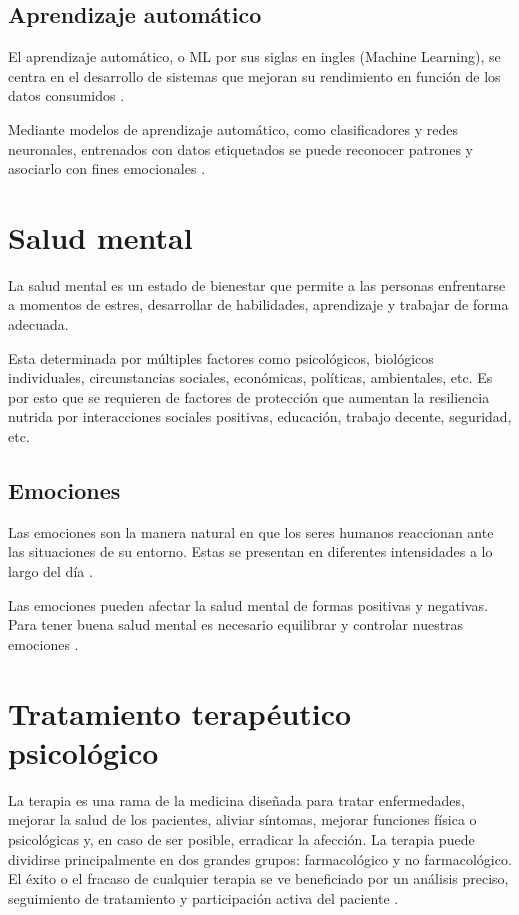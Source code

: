 \documentclass[12pt,twoside]{article}
\begin{document}
	\subsection{Aprendizaje automático}
	El aprendizaje automático, o ML por sus siglas en ingles (Machine Learning), se centra en el desarrollo de sistemas que mejoran su rendimiento en función de los datos consumidos \cite{info: ml}. 
	
	Mediante modelos de aprendizaje automático, como clasificadores y redes neuronales, entrenados con datos etiquetados se puede reconocer patrones y asociarlo con fines emocionales \cite{info: pln3}.
	
	\section{Salud mental}
	La salud mental es un estado de bienestar que permite a las personas enfrentarse a momentos de estres, desarrollar de habilidades, aprendizaje y trabajar de forma adecuada. 
	
	Esta determinada por múltiples factores como psicológicos, biológicos individuales, circunstancias sociales, económicas, políticas, ambientales, etc. Es por esto que se requieren de factores de protección que aumentan la resiliencia nutrida por interacciones sociales positivas, educación, trabajo decente, seguridad, etc. \cite{info: salud1}
	
	\subsection{Emociones}
	Las emociones son la manera natural en que los seres humanos reaccionan ante las situaciones de su entorno. Estas se presentan en diferentes intensidades a lo largo del día \cite{info: salud2}. 
	
	Las emociones pueden afectar la salud mental de formas positivas y negativas. Para tener buena salud mental es necesario equilibrar y controlar nuestras emociones \cite{info: salud3}. 
	
	\section{Tratamiento terapéutico psicológico}
	
	La terapia es una rama de la medicina diseñada para tratar enfermedades, mejorar la salud de los pacientes, aliviar síntomas, mejorar funciones física o psicológicas y, en caso de ser posible, erradicar la afección. La terapia puede dividirse principalmente en dos grandes grupos: farmacológico y no farmacológico. El éxito o el fracaso de cualquier terapia se ve beneficiado por un análisis preciso, seguimiento de tratamiento y participación activa del paciente \cite{info: terapia1}. 
	
\end{document}
